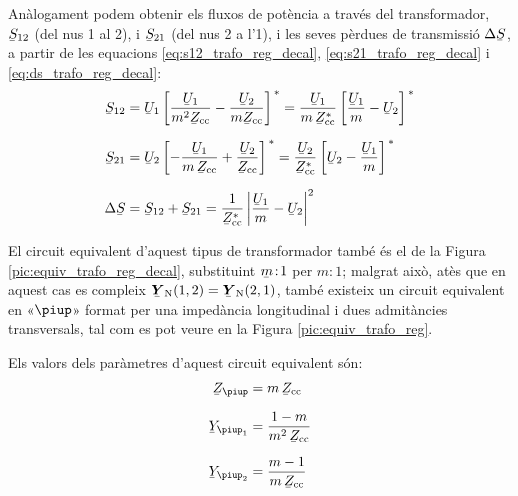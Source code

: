 Anàlogament podem obtenir els fluxos de potència a través del
transformador, $\cmplx{S}_{12}$ (del nus 1 al 2), i $\cmplx{S}_{21}$
(del nus 2 a l'1), i les seves pèrdues de transmissió
$\Delta\cmplx{S}$, a partir de les equacions
\eqref{eq:s12_trafo_reg_decal},  \eqref{eq:s21_trafo_reg_decal} i
\eqref{eq:ds_trafo_reg_decal}:  
\begin{align}
   \cmplx{S}_{12} &= \cmplx{U}_1 \left[ \frac{\cmplx{U}_1}{m^2 \cmplx{Z}\ped{cc}} - \frac{\cmplx{U}_2}{m \cmplx{Z}\ped{cc}} \right]^{\,*} = \frac{\cmplx{U}_1}{m \,\cmplx{Z}\ped{cc}^*} \left[ \frac{\cmplx{U}_1}{m} - \cmplx{U}_2 \right]^{\,*}  \\[1.5ex]
   \cmplx{S}_{21} &= \cmplx{U}_2 \left[ - \frac{\cmplx{U}_1}{m \,\cmplx{Z}\ped{cc}} + \frac{\cmplx{U}_2} {\cmplx{Z}\ped{cc}} \right]^{\,*} = \frac{\cmplx{U}_2}{\cmplx{Z}\ped{cc}^*} \left[  \cmplx{U}_2 - \frac{\cmplx{U}_1}{m}  \right]^{\,*} \\[1.5ex]
 \Delta\cmplx{S} &= \cmplx{S}_{12} + \cmplx{S}_{21} = \frac{1}{\cmplx{Z}\ped{cc}^*}  \left|
    \frac{\cmplx{U}_1}{m} - \cmplx{U}_2 \right|^2
\end{align}


El circuit equivalent d'aquest tipus de transformador també és el de la
 Figura \vref{pic:equiv_trafo_reg_decal}, substituint $\cmplx{m}\!:\!1$ per $m\!:\!1$; malgrat això, atès que en aquest cas es compleix $\mcmplx{Y}\ped{N}(1,2) = \mcmplx{Y}\ped{N}(2,1)$, també
 existeix un circuit equivalent en «$\piup$» format per una impedància longitudinal i dues admitàncies transversals, tal com es pot veure en la Figura  \vref{pic:equiv_trafo_reg}.

\begin{center}
    
    \label{pic:equiv_trafo_reg}
\end{center}

Els valors dels paràmetres d'aquest circuit equivalent són:
\begin{align}
   \cmplx{Z}_\piup &= m \, \cmplx{Z}\ped{cc} \\[1.5ex]
   \cmplx{Y}_{\piup_1} &= \frac{1-m}{m^2 \,\cmplx{Z}\ped{cc}} \\[1.5ex]
   \cmplx{Y}_{\piup_2} &= \frac{m-1}{m\, \cmplx{Z}\ped{cc}}
\end{align}

